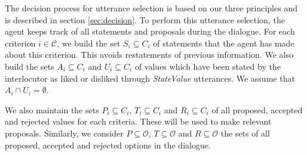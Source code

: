 \documentclass{llncs}
\begin{document}
	\medskip
	The decision process for utterance selection is based on our three principles and is described in section \ref{sec:decision}. To perform this utterance selection, the agent keeps track of all statements and proposals during the dialogue. For each criterion $i\in\mathcal{C}$, we build the set $S_i \subseteq C_i$ of statements that the agent has made about this criterion. This avoids restatements of previous information. We also build the sets $A_i\subseteq C_i$ and $U_i\subseteq C_i$ of values which have been stated by the interlocutor as liked or disliked through \emph{StateValue} utterances. We assume that $A_i\cap U_i=\emptyset$.
	
	We also maintain the sets $P_i \subseteq C_i$, $T_i\subseteq C_i$ and $R_i\subseteq C_i$ of all proposed, accepted and rejected values for each criteria. These will be used to make relevant proposals. Similarly, we consider $P\subseteq \mathcal{O}$, $T\subseteq \mathcal{O}$ and $R\subseteq \mathcal{O}$ the sets of all proposed, accepted and rejected options in the dialogue.
	
\end{document}
